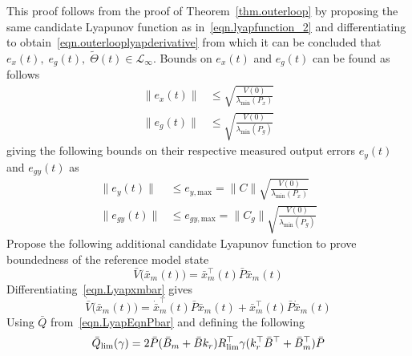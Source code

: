 \documentclass[journal]{IEEEtran}
\theoremstyle{innercustomthm}
\begin{document}
  \begin{proof-dan}
    This proof follows from the proof of Theorem~\ref{thm.outerloop} by proposing the same candidate Lyapunov function as in\ \eqref{eqn.lyapfunction_2} and differentiating to obtain\ \eqref{eqn.outerlooplyapderivative} from which it can be concluded that $e_{x}(t), \; e_{g}(t) , \;\widetilde{\Theta}(t)\in\mathcal{L}_{\infty}$.
    Bounds on $e_{x}(t)$ and $e_{g}(t)$ can be found as follows
    \begin{equation}
      \label{eqn.boundaonexandeg}
      \begin{split}
        \|e_{x}(t)\|
        & \leq
        \sqrt{\frac{V(0)}{\lambda_{\text{min}}(P_{x})}} \\
        \|e_{g}(t)\|
        & \leq
        \sqrt{\frac{V(0)}{\lambda_{\text{min}}(P_{g})}}
      \end{split}
    \end{equation}
    giving the following bounds on their respective measured output errors $e_{y}(t)$ and $e_{gy}(t)$ as
    \begin{equation}
      \label{eqn.boundaoneyandegy}
      \begin{split}
        \|e_{y}(t)\|
        & \leq
        e_{y,\text{max}}
        =
        \|C\|
        \sqrt{\frac{V(0)}{\lambda_{\text{min}}(P_{x})}} \\
        \|e_{gy}(t)\|
        & \leq
        e_{gy,\text{max}}
        =
        \|C_{g}\|
        \sqrt{\frac{V(0)}{\lambda_{\text{min}}(P_{g})}}
      \end{split}
    \end{equation}
    Propose the following additional candidate Lyapunov function to prove boundedness of the reference model state
    \begin{equation}
      \label{eqn.Lyapxmbar}
      \bar{V}\bigr(\bar{x}_{m}(t)\bigr) = \bar{x}_{m}^{\top}(t)\bar{P}\bar{x}_{m}(t)
    \end{equation}
    Differentiating\ \eqref{eqn.Lyapxmbar} gives
    \begin{equation}
      \label{eqn.Lyapxmbardot1}
      \dot{\bar{V}}\bigr(\bar{x}_{m}(t)\bigr)
      =
      \dot{\bar{x}}_{m}^{\top}(t)\bar{P}\bar{x}_{m}(t)
      + \bar{x}_{m}^{\top}(t)\bar{P}\dot{\bar{x}}_{m}(t)
    \end{equation}
    Using $\bar{Q}$ from\ \eqref{eqn.LyapEqnPbar} and defining the following
    \begin{equation}
      \label{eqn.qbarlim}
      \bar{Q}_{\rm{\lim}}(\gamma)
      =
      2\bar{P}(\bar{B}_{m}+\bar{B}k_{r})R_{\text{lim}}^{\top}\gamma (k_{r}^{\top}\bar{B}^{\top}+\bar{B}_{m}^{\top})\bar{P}

\end{equation}
\end{proof-dan}
\end{document}
